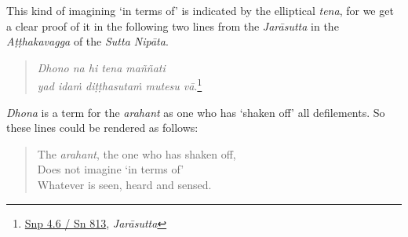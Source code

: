 This kind of imagining `in terms of' is indicated by the elliptical \emph{tena}, for we get a clear proof of it in the following two lines from the \emph{Jarāsutta} in the \emph{Aṭṭhakavagga} of the \emph{Sutta Nipāta}.

\begin{quote}
\emph{Dhono na hi tena maññati}\\
\emph{yad idaṁ diṭṭhasutaṁ mutesu vā}.\footnote{\href{https://suttacentral.net/snp4.6/pli/ms}{Snp 4.6 / Sn 813}, \emph{Jarāsutta}}
\end{quote}

\clearpage

\emph{Dhona} is a term for the \emph{arahant} as one who has `shaken off' all defilements. So these lines could be rendered as follows:

\begin{quote}
The \emph{arahant}, the one who has shaken off,\\
Does not imagine `in terms of'\\
Whatever is seen, heard and sensed.
\end{quote}

